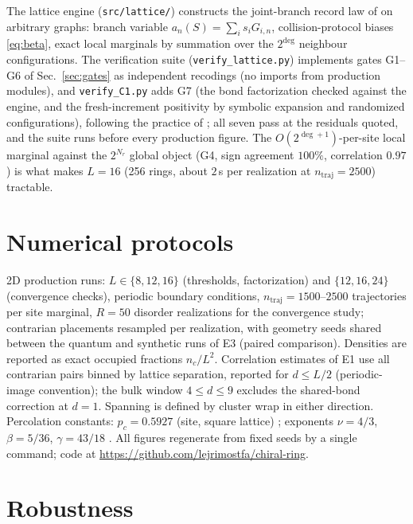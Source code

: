 \documentclass[11pt]{article}
\begin{document}
The lattice engine (\texttt{src/lattice/}) constructs the joint-branch
record law of \cite{p2} on arbitrary graphs: branch variable
$a_n(S) = \sum_i s_i G_{i,n}$, collision-protocol biases \eqref{eq:beta},
exact local marginals by summation over the $2^{\deg}$ neighbour
configurations. The verification suite (\texttt{verify\_lattice.py})
implements gates G1--G6 of Sec.~\ref{sec:gates} as independent recodings
(no imports from production modules), and \texttt{verify\_C1.py} adds G7 (the
bond factorization checked against the engine, and the fresh-increment
positivity by symbolic expansion and randomized configurations), following the
practice of \cite{p1,p2}; all seven pass at the residuals quoted, and the
suite runs before every production figure. The $O(2^{\deg+1})$-per-site local marginal
against the $2^{N_r}$ global object (G4, sign agreement $100\%$,
correlation $0.97$) is what makes $L=16$ (256 rings, about $2$\,s per
realization at $n_{\mathrm{traj}} = 2500$) tractable.

\section{Numerical protocols}

2D production runs: $L \in \{8,12,16\}$ (thresholds, factorization) and
$\{12,16,24\}$ (convergence checks), periodic boundary conditions,
$n_{\mathrm{traj}} = 1500$--$2500$ trajectories per site marginal, $R = 50$
disorder realizations for the convergence study; contrarian placements
resampled per realization, with geometry seeds shared between the quantum
and synthetic runs of E3 (paired comparison). Densities are reported as
exact occupied fractions $n_c/L^2$. Correlation estimates of E1 use all
contrarian pairs binned by lattice separation, reported for $d \le L/2$
(periodic-image convention); the bulk window $4 \le d \le 9$ excludes the
shared-bond correction at $d=1$. Spanning is defined by cluster wrap in
either direction. Percolation constants: $p_c = 0.5927$ (site, square
lattice) \cite{newmanziff,newmanziff2001}; exponents $\nu = 4/3$, $\beta = 5/36$,
$\gamma = 43/18$ \cite{stauffer,dennijs}. All figures regenerate from fixed
seeds by a single command; code at
\url{https://github.com/lejrimostfa/chiral-ring}.

\section{Robustness}
\label{app:robust}
\end{document}
